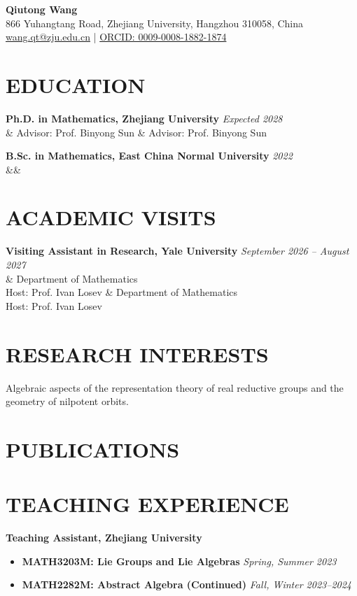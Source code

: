 \documentclass[11pt,a4paper]{article}
\newcommand*{\customcventry}[4][2pt]{
  \noindent
  {\bfseries #2} \hfill {\itshape\color{SecondaryGray}#3} \\ %
  \ifx&#4& \else 
    \noindent #4 \\ %
  \fi
  \par\addvspace{#1}
}
\begin{document}
\begin{center}
    {\Huge \bfseries \color{academicblue} Qiutong Wang} \\ [10pt]
    \small
    \faMapMarker*\enspace \color{darkgray} 866 Yuhangtang Road, Zhejiang University, Hangzhou 310058, China \\
    \faEnvelope[regular]\enspace \href{mailto:wang.qt@zju.edu.cn}{wang.qt@zju.edu.cn}
    \enspace | \enspace \href{https://orcid.org/0009-0008-1882-1874}{ORCID: 0009-0008-1882-1874}
\end{center}

\vspace{5mm}


\section{EDUCATION}

\customcventry{Ph.D. in Mathematics, Zhejiang University}{Expected 2028}{
    Advisor: Prof. Binyong Sun
}

\customcventry{B.Sc. in Mathematics, East China Normal University}{2022}{}


\section{ACADEMIC VISITS}

\customcventry{Visiting Assistant in Research, Yale University}{September 2026 -- August 2027}{
    Department of Mathematics \\
    Host: Prof. Ivan Losev
}


\section{RESEARCH INTERESTS}
\noindent Algebraic aspects of the representation theory of real reductive groups and the geometry of nilpotent orbits.


\section{PUBLICATIONS}
\nocite{*} 
\printbibliography[heading=none]


\section{TEACHING EXPERIENCE}
\noindent \textbf{Teaching Assistant, Zhejiang University} \hfill \\
\begin{itemize}[leftmargin=1.5em, noitemsep, topsep=2pt]
  \item \textbf{MATH3203M: Lie Groups and Lie Algebras} \hfill \textit{Spring, Summer 2023}
  \item \textbf{MATH2282M: Abstract Algebra (Continued)} \hfill \textit{Fall, Winter 2023--2024}
\end{itemize}
\end{document}
